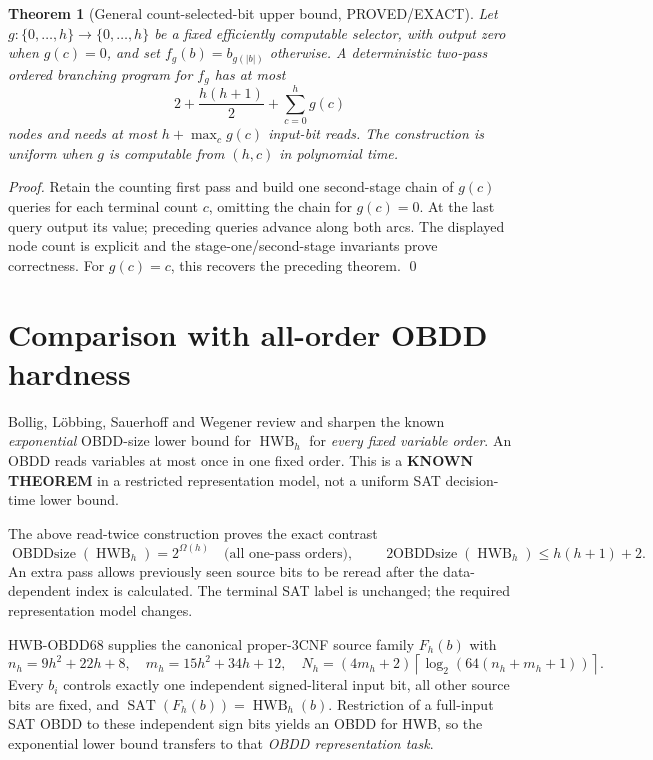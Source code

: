 \documentclass[11pt]{article}
\newtheorem{theorem}{Theorem}
\begin{document}
\begin{theorem}[General count-selected-bit upper bound, PROVED/EXACT]
Let $g:\{0,\ldots,h\}\to\{0,\ldots,h\}$ be a fixed efficiently computable selector, with output zero when $g(c)=0$, and set
$f_g(b)=b_{g(|b|)}$ otherwise. A deterministic two-pass ordered branching program for $f_g$ has at most
\[
2+\frac{h(h+1)}2+\sum_{c=0}^{h}g(c)
\]
nodes and needs at most $h+\max_c g(c)$ input-bit reads. The construction is uniform when $g$ is computable from $(h,c)$ in polynomial time.
\end{theorem}
\begin{proof}
Retain the counting first pass and build one second-stage chain of $g(c)$ queries for each terminal count $c$, omitting the chain for $g(c)=0$. At the last query output its value; preceding queries advance along both arcs. The displayed node count is explicit and the stage-one/second-stage invariants prove correctness. For $g(c)=c$, this recovers the preceding theorem. \qed
\end{proof}

\section{Comparison with all-order OBDD hardness}
Bollig, L\"obbing, Sauerhoff and Wegener review and sharpen the known \emph{exponential} OBDD-size lower bound for $\operatorname{HWB}_h$ for \emph{every fixed variable order}. An OBDD reads variables at most once in one fixed order. This is a \textbf{KNOWN THEOREM} in a restricted representation model, not a uniform SAT decision-time lower bound.

The above read-twice construction proves the exact contrast
\[
\operatorname{OBDDsize}(\operatorname{HWB}_h)=2^{\Omega(h)}
\quad\text{(all one-pass orders)},\qquad
\operatorname{2OBDDsize}(\operatorname{HWB}_h)\le h(h+1)+2.
\]
An extra pass allows previously seen source bits to be reread after the data-dependent index is calculated. The terminal SAT label is unchanged; the required representation model changes.

HWB-OBDD68 supplies the canonical proper-3CNF source family $F_h(b)$ with
\[
n_h=9h^2+22h+8,\quad m_h=15h^2+34h+12,\quad
N_h=(4m_h+2)\left\lceil\log_2(64(n_h+m_h+1))\right\rceil.
\]
Every $b_i$ controls exactly one independent signed-literal input bit, all other source bits are fixed, and
$\operatorname{SAT}(F_h(b))=\operatorname{HWB}_h(b)$.
Restriction of a full-input SAT OBDD to these independent sign bits yields an OBDD for HWB, so the exponential lower bound transfers to that \emph{OBDD representation task}.
\end{document}
